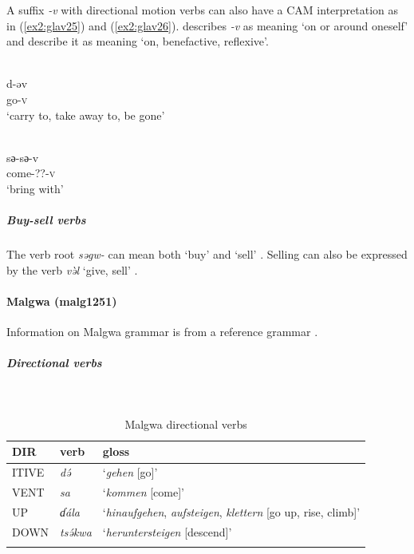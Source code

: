 A suffix \textit{-v} with directional motion verbs can also have a CAM interpretation as in (\ref{ex2:glav25}) and (\ref{ex2:glav26}). \citet[22]{nghagyiyaSketchGlavdaGrammar2011} describes \textit{-v} as meaning `on or around oneself' and \citet[662]{bubaGlavdaMorphology2007} describe it as meaning `on, benefactive, reflexive'. 

\ea\label{ex2:glav25}
 \\
\gll d-əv \\
go-\textsc{v} \\
\glt `carry to, take away to, be gone'

\ex\label{ex2:glav26}
 \\
\gll sә-sә-v	\\ 	
come-??-\textsc{v} \\
\glt `bring with'
\z

\subparagraph{Buy-sell verbs}

The verb root \textit{səgw-} can mean both `buy' and `sell' \citep[648, 672]{bubaGlavdaMorphology2007}. Selling can also be expressed by the verb \textit{və̀l} `give, sell' \citep[642]{bubaGlavdaMorphology2007}.

\paragraph*{Malgwa (malg1251)} \label{malg}

Information on Malgwa grammar is from a reference grammar \citep{lohrSpracheMalgwaNara2002}.

\subparagraph{Directional verbs}~

\begin{table}[H]
	\caption{Malgwa directional verbs} 
	\label{tab:malgV}
	\begin{tabular}{lll} %
		\lsptoprule
		DIR & verb & gloss   \\ %
		\midrule
		ITIVE & \textit{də́} & `\textit{gehen} [go]' \\
		VENT & \textit{sa} & `\textit{kommen} [come]' \\
		UP & \textit{ɗála} & `\textit{hinaufgehen}, \textit{aufsteigen}, \textit{klettern} [go up, rise, climb]' \\
		DOWN & \textit{tsə́kwa} & `\textit{heruntersteigen} [descend]' \\
		\lspbottomrule
	\end{tabular}
\end{table}

